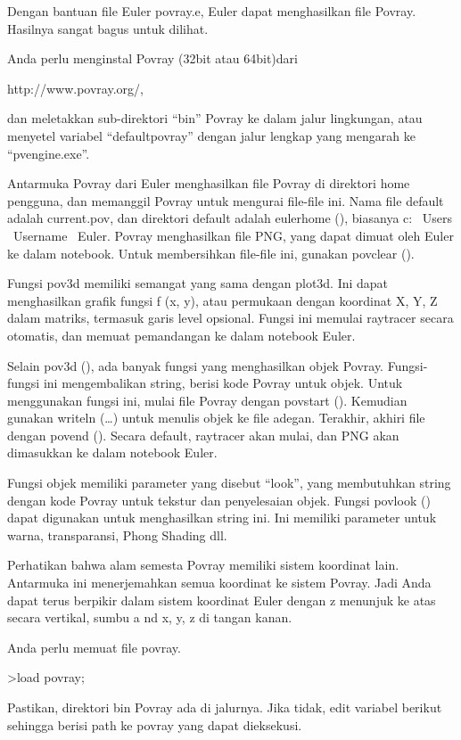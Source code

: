 \documentclass[
]{book}
\begin{document}
Dengan bantuan file Euler povray.e, Euler dapat menghasilkan file Povray. Hasilnya sangat bagus untuk dilihat.

Anda perlu menginstal Povray (32bit atau 64bit)dari

http://www.povray.org/,

dan meletakkan sub-direktori ``bin'' Povray ke dalam jalur lingkungan, atau menyetel variabel ``defaultpovray'' dengan jalur lengkap yang mengarah ke ``pvengine.exe''.

Antarmuka Povray dari Euler menghasilkan file Povray di direktori home pengguna, dan memanggil Povray untuk mengurai file-file ini. Nama file default adalah current.pov, dan direktori default adalah eulerhome (), biasanya c: ~Users ~Username ~Euler. Povray menghasilkan file PNG, yang dapat dimuat oleh Euler ke dalam notebook. Untuk membersihkan file-file ini, gunakan povclear ().

Fungsi pov3d memiliki semangat yang sama dengan plot3d. Ini dapat menghasilkan grafik fungsi f (x, y), atau permukaan dengan koordinat X, Y, Z dalam matriks, termasuk garis level opsional. Fungsi ini memulai raytracer secara otomatis, dan memuat pemandangan ke dalam notebook Euler.

Selain pov3d (), ada banyak fungsi yang menghasilkan objek Povray. Fungsi-fungsi ini mengembalikan string, berisi kode Povray untuk objek. Untuk menggunakan fungsi ini, mulai file Povray dengan povstart (). Kemudian gunakan writeln (\ldots) untuk menulis objek ke file adegan. Terakhir, akhiri file dengan povend (). Secara default, raytracer akan mulai, dan PNG akan dimasukkan ke dalam notebook Euler.

Fungsi objek memiliki parameter yang disebut ``look'', yang membutuhkan string dengan kode Povray untuk tekstur dan penyelesaian objek. Fungsi povlook () dapat digunakan untuk menghasilkan string ini. Ini memiliki parameter untuk warna, transparansi, Phong Shading dll.

Perhatikan bahwa alam semesta Povray memiliki sistem koordinat lain. Antarmuka ini menerjemahkan semua koordinat ke sistem Povray. Jadi Anda dapat terus berpikir dalam sistem koordinat Euler dengan z menunjuk ke atas secara vertikal, sumbu a nd x, y, z di tangan kanan.

Anda perlu memuat file povray.

\textgreater load povray;

Pastikan, direktori bin Povray ada di jalurnya. Jika tidak, edit variabel berikut sehingga berisi path ke povray yang dapat dieksekusi.
\end{document}
